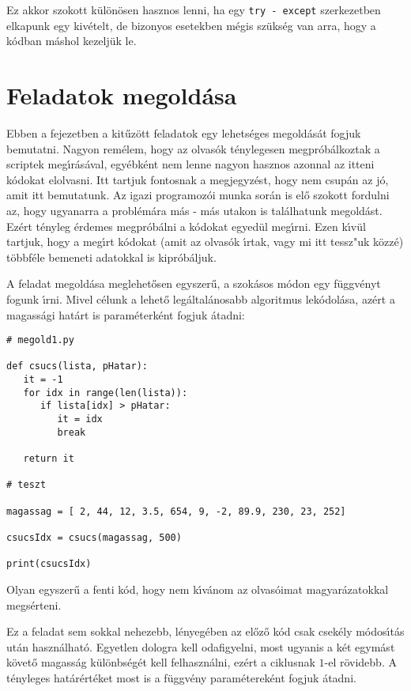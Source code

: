 Ez akkor szokott k\"ul\"on\"osen hasznos lenni, ha egy {\tt try - except} szerkezetben elkapunk egy kiv\'etelt, de bizonyos 
esetekben m\'egis sz\"uks\'eg van arra, hogy a k\'odban m\'ashol kezelj\"uk le.

\setcounter{section}{5}
\section{Feladatok megold\'asa}

Ebben a fejezetben a kit\H{u}z\"ott feladatok egy lehets\'eges megold\'as\'at fogjuk bemutatni. Nagyon rem\'elem, hogy az 
olvas\'ok t\'enylegesen megpr\'ob\'alkoztak a scriptek meg\'{\i}r\'as\'aval, egy\'ebk\'ent nem lenne nagyon hasznos azonnal 
az itteni k\'odokat elolvasni. Itt tartjuk fontosnak a megjegyz\'est, hogy nem csup\'an az j\'o, amit itt bemutatunk. Az 
igazi programoz\'oi munka sor\'an is el\H{o} szokott fordulni az, hogy ugyanarra a probl\'em\'ara m\'as - m\'as utakon is 
tal\'alhatunk megold\'ast. Ez\'ert t\'enyleg \'erdemes megpr\'ob\'alni a k\'odokat egyed\"ul meg\'{\i}rni. Ezen k\'{\i}v\"ul 
tartjuk, hogy a meg\'{\i}rt k\'odokat (amit az olvas\'ok \'{\i}rtak, vagy mi itt tessz"uk k\"ozz\'e) t\"obbf\'ele bemeneti 
adatokkal is kipr\'ob\'aljuk.

\themegold

A feladat megold\'asa meglehet\H{o}sen egyszer\H{u}, a szok\'asos m\'odon egy f\"uggv\'enyt fogunk \'{\i}rni. Mivel c\'elunk 
a lehet\H{o} leg\'altal\'anosabb algoritmus lek\'odol\'asa, az\'ert a magass\'agi hat\'art is param\'eterk\'ent fogjuk 
\'atadni:

\begin{Verbatim}[fontsize=\small]
# megold1.py

def csucs(lista, pHatar):
   it = -1
   for idx in range(len(lista)):
      if lista[idx] > pHatar:
      	 it = idx
      	 break

   return it

# teszt

magassag = [ 2, 44, 12, 3.5, 654, 9, -2, 89.9, 230, 23, 252]

csucsIdx = csucs(magassag, 500)

print(csucsIdx)
\end{Verbatim}

Olyan egyszer\H{u} a fenti k\'od, hogy nem k\'{\i}v\'anom az olvas\'oimat magyar\'azatokkal megs\'erteni.

\themegold

Ez a feladat sem sokkal nehezebb, l\'enyeg\'eben az el\H{o}z\H{o} k\'od csak csek\'ely m\'odos\'{\i}t\'as 
ut\'an haszn\'alhat\'o. Egyetlen dologra kell odafigyelni, most ugyanis a k\'et egym\'ast k\"ovet\H{o} 
magass\'ag k\"ul\"onbs\'eg\'et kell felhaszn\'alni, ez\'ert a ciklusnak $1$-el r\"ovidebb. A t\'enyleges 
hat\'ar\'ert\'eket most is a f\"uggv\'eny param\'eterek\'ent fogjuk \'atadni.


